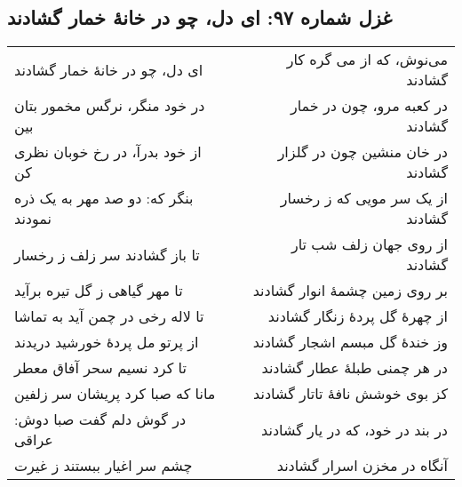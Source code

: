 \begin{center}
\section*{غزل شماره ۹۷: ای دل، چو در خانهٔ خمار گشادند}
\label{sec:097}
\begin{longtable}{l p{0.5cm} r}
ای دل، چو در خانهٔ خمار گشادند
&&
می‌نوش، که از می گره کار گشادند
\\
در خود منگر، نرگس مخمور بتان بین
&&
در کعبه مرو، چون در خمار گشادند
\\
از خود بدرآ، در رخ خوبان نظری کن
&&
در خان منشین چون در گلزار گشادند
\\
بنگر که: دو صد مهر به یک ذره نمودند
&&
از یک سر مویی که ز رخسار گشادند
\\
تا باز گشادند سر زلف ز رخسار
&&
از روی جهان زلف شب تار گشادند
\\
تا مهر گیاهی ز گل تیره برآید
&&
بر روی زمین چشمهٔ انوار گشادند
\\
تا لاله رخی در چمن آید به تماشا
&&
از چهرهٔ گل پردهٔ زنگار گشادند
\\
از پرتو مل پردهٔ خورشید دریدند
&&
وز خندهٔ گل مبسم اشجار گشادند
\\
تا کرد نسیم سحر آفاق معطر
&&
در هر چمنی طبلهٔ عطار گشادند
\\
مانا که صبا کرد پریشان سر زلفین
&&
کز بوی خوشش نافهٔ تاتار گشادند
\\
در گوش دلم گفت صبا دوش: عراقی
&&
در بند در خود، که در یار گشادند
\\
چشم سر اغیار ببستند ز غیرت
&&
آنگاه در مخزن اسرار گشادند
\\
\end{longtable}
\end{center}
